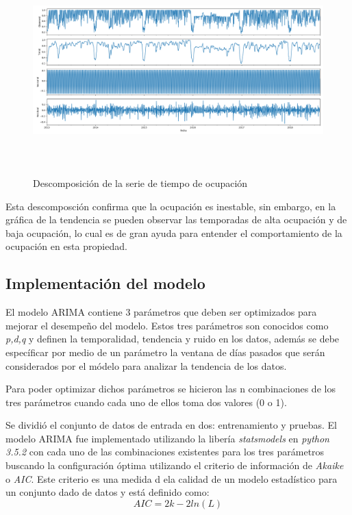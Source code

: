\begin{figure}[H]
  \centering
      \includegraphics[width=\maxwidth,height=8cm]{figures/Decomp.png}    
  \caption{Descomposición de la serie de tiempo de ocupación}
\end{figure}

Esta descomposción confirma que la ocupación es inestable, sin embargo, en la gráfica de la tendencia se pueden observar las temporadas de alta ocupación y de baja ocupación, lo cual es de gran ayuda para entender el comportamiento de la ocupación en esta propiedad.

\subsection*{Implementación del modelo}

El modelo ARIMA contiene 3 parámetros que deben ser optimizados para mejorar el desempeño del modelo. Estos tres parámetros son conocidos como \emph{p,d,q} y definen la temporalidad, tendencia y ruido en los datos, además se debe específicar por medio de un parámetro la ventana de días pasados que serán considerados por el módelo para analizar la tendencia de los datos.

Para poder optimizar dichos parámetros se hicieron las n combinaciones de los tres parámetros cuando cada uno de ellos toma dos valores (0 o 1).

Se dividió el conjunto de datos de entrada en dos: entrenamiento y pruebas. El modelo ARIMA fue implementado utilizando la libería \emph{statsmodels} en \emph{python 3.5.2} con cada uno de las combinaciones existentes para los tres parámetros buscando la configuración óptima utilizando el criterio de información de \emph{Akaike} o \emph{AIC}. Este criterio es una medida d ela calidad de un modelo estadístico para un conjunto dado de datos y está definido como: $$AIC = 2k - 2ln(L)$$

